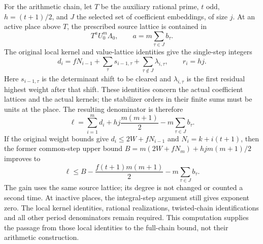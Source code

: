 For the arithmetic chain, let $T$ be the auxiliary rational prime,
$t$ odd, $h=(t+1)/2$, and $J$ the selected set of coefficient
embeddings, of size $j$.  At an active place above $T$, the prescribed
source lattice is contained in
\[
 T^a U_0^m\Lambda_0,\qquad
 a=m\sum_{\tau\in J}b_\tau.
\]
The original local kernel and value-lattice identities give the
single-step integers
\[
 d_i=fN_{i-1}+\sum_\tau s_{i-1,\tau}
                    +\sum_{\tau\notin J}\lambda_{i,\tau},
 \qquad r_i=hj.
\]
Here $s_{i-1,\tau}$ is the determinant shift to be cleared and
$\lambda_{i,\tau}$ is the first residual highest weight after that
shift.  These identities concern the actual coefficient lattices and
the actual kernels; the stabilizer orders in their finite sums must
be units at the place.  The resulting denominator is therefore
\begin{equation}\label{shared-level-chain-exact-loss}
 \ell=\sum_{i=1}^m d_i+hj\frac{m(m+1)}2
                         -m\sum_{\tau\in J}b_\tau.
\end{equation}
If the original weight bounds give $d_i\le2W+fN_{i-1}$ and
$N_i=k+i(t+1)$, then the former common-step upper bound
$B=m(2W+fN_m)+hj m(m+1)/2$ improves to
\[
 \ell\le B-\frac{f(t+1)m(m+1)}2-m\sum_{\tau\in J}b_\tau.
\]
The gain uses the same source lattice; its degree is not changed or
counted a second time.  At inactive places, the integral-step argument
still gives exponent zero.  The local kernel identities, rational
realizations, twisted-chain identifications and all other period
denominators remain required.  This computation supplies the passage
from those local identities to the full-chain bound, not their
arithmetic construction.
